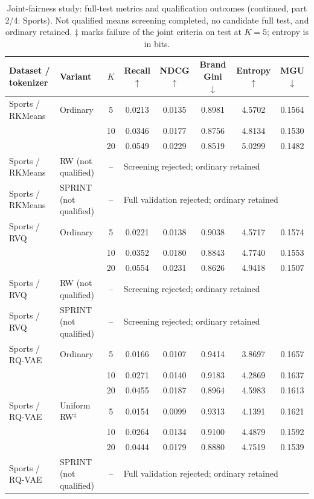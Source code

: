 \begin{table}[p]
\centering\small
\setlength{\tabcolsep}{3pt}
\addtocounter{table}{-1}
\caption[]{Joint-fairness study: full-test metrics and qualification outcomes (continued, part 2/4: Sports). Not qualified means screening completed, no candidate full test, and ordinary retained. $\ddagger$ marks failure of the joint criteria on test at $K=5$; entropy is in bits.}
\label{tab:joint-fairness-tests-sports}
\begin{tabular}{llcccccc}
\toprule
Dataset / tokenizer & Variant & $K$ & Recall $\uparrow$ & NDCG $\uparrow$ & Brand Gini $\downarrow$ & Entropy $\uparrow$ & MGU $\downarrow$ \\
\midrule
Sports / RKMeans & Ordinary & 5 & 0.0213 & 0.0135 & 0.8981 & 4.5702 & 0.1564 \\
 &  & 10 & 0.0346 & 0.0177 & 0.8756 & 4.8134 & 0.1530 \\
 &  & 20 & 0.0549 & 0.0229 & 0.8519 & 5.0299 & 0.1482 \\
Sports / RKMeans & RW (not qualified) & -- & \multicolumn{5}{l}{Screening rejected; ordinary retained} \\
Sports / RKMeans & SPRINT (not qualified) & -- & \multicolumn{5}{l}{Full validation rejected; ordinary retained} \\
\midrule
Sports / RVQ & Ordinary & 5 & 0.0221 & 0.0138 & 0.9038 & 4.5717 & 0.1574 \\
 &  & 10 & 0.0352 & 0.0180 & 0.8843 & 4.7740 & 0.1553 \\
 &  & 20 & 0.0554 & 0.0231 & 0.8626 & 4.9418 & 0.1507 \\
Sports / RVQ & RW (not qualified) & -- & \multicolumn{5}{l}{Screening rejected; ordinary retained} \\
Sports / RVQ & SPRINT (not qualified) & -- & \multicolumn{5}{l}{Screening rejected; ordinary retained} \\
\midrule
Sports / RQ-VAE & Ordinary & 5 & 0.0166 & 0.0107 & 0.9414 & 3.8697 & 0.1657 \\
 &  & 10 & 0.0271 & 0.0140 & 0.9183 & 4.2869 & 0.1637 \\
 &  & 20 & 0.0455 & 0.0187 & 0.8964 & 4.5983 & 0.1613 \\
Sports / RQ-VAE & Uniform RW$^{\ddagger}$ & 5 & 0.0154 & 0.0099 & 0.9313 & 4.1391 & 0.1621 \\
 &  & 10 & 0.0264 & 0.0134 & 0.9100 & 4.4879 & 0.1592 \\
 &  & 20 & 0.0444 & 0.0179 & 0.8880 & 4.7519 & 0.1539 \\
Sports / RQ-VAE & SPRINT (not qualified) & -- & \multicolumn{5}{l}{Full validation rejected; ordinary retained} \\

\end{tabular}
\end{table}
